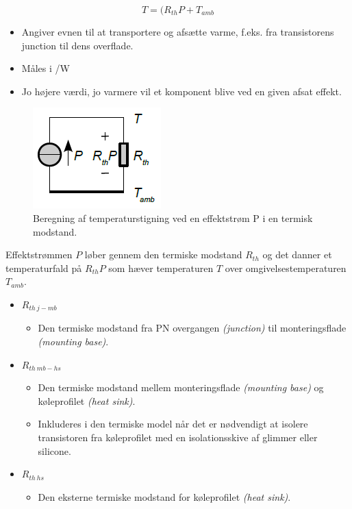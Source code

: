 \documentclass[danish]{article}
\begin{document}
\begin{equation}
T = (R_{th} P + T_{amb}
\end{equation}

\begin{itemize}
	\item Angiver evnen til at transportere og afsætte varme, f.eks. fra transistorens junction til dens overflade.
	\item Måles i \SIUnitSymbolCelsius /\si{\watt}
	\item Jo højere værdi, jo varmere vil et komponent blive ved en given afsat effekt.
\end{itemize}

\begin{figure} [H]
	\centering
	\includegraphics[width=0.3\linewidth]{graphics/ohmslovanalogi}
	\caption{Beregning af temperaturstigning ved en effektstrøm P i en termisk modstand.}
	\label{fig:ohmslovanalogi}
\end{figure}

Effektstrømmen $P$ løber gennem den termiske modstand $R_{th}$ og det
danner et temperaturfald på $R_{th}P$ som hæver temperaturen $T$ over omgivelsestemperaturen $T_{amb}$.

\begin{itemize}
	\item $R_{th\:j-mb}$
	\begin{itemize}
		\item Den termiske modstand fra PN overgangen \textit{(junction)} til monteringsflade	\textit{(mounting base)}.
	\end{itemize}
	\item $R_{th\: mb-hs}$
	\begin{itemize}
		\item Den termiske modstand mellem monteringsflade	\textit{(mounting base)} og køleprofilet \textit{(heat sink)}.
		\item Inkluderes i den termiske model når det er nødvendigt at isolere transistoren fra køleprofilet med en isolationsskive af glimmer eller silicone.
	\end{itemize} 
	\item $R_{th\: hs}$ 
	\begin{itemize}
		\item Den eksterne termiske modstand for køleprofilet \textit{(heat sink)}.
	\end{itemize}
\end{itemize}
\end{document}
